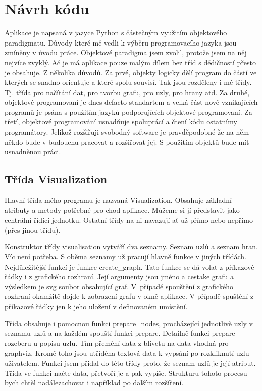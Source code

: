 \documentclass[color,table,oneside,nolot,nolof]{fithesis}
\begin{document}
\section{Návrh kódu}
	Aplikace je napsaná v jazyce Python s částečným využitím objektového paradigmatu. Důvody které mě vedli k výběru programovacího jazyka jsou zmíněny v úvodu práce. Objektové 
	paradigma jsem zvolil, protože jsem na něj nejvíce zvyklý. Ač je má aplikace pouze malým dílem bez tříd s dědičností přesto je obsahuje. Z několika důvodů. Za prvé, objekty logicky
	dělí program do částí ve kterých se snadno orientuje a které spolu souvisí. Tak jsou rozděleny i mé třídy. Tj. třída pro načítání dat, pro tvorbu grafu, pro uzly, pro hrany atd.
	Za druhé, objektové programovaní je dnes defacto standartem a velká část nově vznikajících programů je psána s použitím jazyků podporujících objektové programovaní. Za třetí,
	objektové programování usnadňuje spoluprácí a čtení kódu ostatnímy programátory. Jelikož rozšiřuji svobodný software je pravděpodobné že na něm někdo bude v budoucnu pracovat
	a rozšiřovat jej. S použitím objektů bude mít usnadněnou práci.
	
\subsection{Třída Visualization}
	Hlavní třída mého programu je nazvaná Visualization. Obsahuje základní atributy a metody potřebné pro chod aplikace. Můžeme si jí představit jako centrální řídící jednotku. Ostatní
	třídy na ni navazují ať už přímo nebo nepřímo (přes jinou třídu). 

	Konstruktor třídy visualisation vytváří dva seznamy. Seznam uzlů a seznam hran. Víc není potřeba. S oběma seznamy už pracují hlavně funkce v jiných třídách. Nejdůležitější funkcí
	je funkce create_graph. Tato funkce se dá volat z příkazové řádky i z grafického rozhraní. Její argumenty jsou jméno a cestake grafu a výsledkem je svg soubor obsahující graf. 
	V~případě spouštění z grafického rozhraní okamžitě dojde k zobrazení grafu v okně aplikace. V případě spuštění z příkazové řádky jen k jeho uložení v definovaném umístění. 

	Třída obsahuje i pomocnou funkci prepare_nodes, procházející jednotlivě uzly v seznamu uzlů a na každém spouští funkci prepare. Detailně funkci prepare rozeberu u popisu uzlu. Tím
	přemění data z blivetu na data vhodná pro graphviz. Kromě toho jsou utříděna textová data k vypsání po rozkliknutí uzlu uživatelem. Funkci jsem přidal do této třídy proto, že 
	seznam uzlů je její atribut. Třída ve funkci načte data, přetvoří je a pak vypíše. Strukturu tohoto procesu bych chtěl nadálezachovat i například po dalším rozšíření.  
\end{document}
